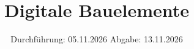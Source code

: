 


\subject{v350}
\title{Digitale Bauelemente}
\date{%
  Durchführung: 05.11.2026
  \hspace{3em}
  Abgabe: 13.11.2026
}



\maketitle
\thispagestyle{empty}
\tableofcontents
\newpage






\printbibliography{}




